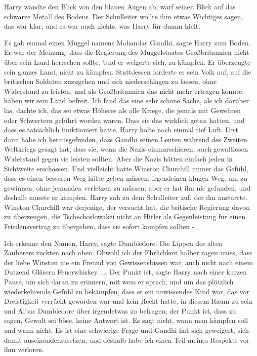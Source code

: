 Harry wandte den Blick von den blauen Augen ab, warf seinen Blick auf das
schwarze Metall des Bodens. Der Schulleiter wollte ihm etwas Wichtiges sagen,
das war klar; und es war auch nichts, was Harry für dumm hielt.

\glqq{}Es gab einmal einen Muggel namens Mohandas Gandhi\grqq{}, sagte Harry zum
Boden. \glqq{}Er war der Meinung, dass die Regierung des Muggelstaates
Großbritannien nicht über sein Land herrschen sollte. Und er weigerte sich, zu
kämpfen. Er überzeugte sein ganzes Land, nicht zu kämpfen. Stattdessen forderte
er sein Volk auf, auf die britischen Soldaten zuzugehen und sich niederschlagen
zu lassen, ohne Widerstand zu leisten, und als Großbritannien das nicht mehr
ertragen konnte, haben wir sein Land befreit. Ich fand das eine sehr schöne
Sache, als ich darüber las, dachte ich, das sei etwas Höheres als alle Kriege,
die jemals mit Gewehren oder Schwertern geführt worden waren. Dass sie das
wirklich getan hatten, und dass es tatsächlich funktioniert hatte.\grqq{} Harry
holte noch einmal tief Luft. \glqq{}Erst dann habe ich herausgefunden, dass
Gandhi seinen Leuten während des Zweiten Weltkriegs gesagt hat, dass sie, wenn
die Nazis einmarschieren, auch gewaltlosen Widerstand gegen sie leisten sollten.
Aber die Nazis hätten einfach jeden in Sichtweite erschossen. Und vielleicht
hatte Winston Churchill immer das Gefühl, dass es einen besseren Weg hätte geben
müssen, irgendeinen klugen Weg, um zu gewinnen, ohne jemanden verletzen zu
müssen; aber er hat ihn nie gefunden, und deshalb musste er kämpfen.\grqq{}
Harry sah zu dem Schulleiter auf, der ihn anstarrte. \glqq{}Winston Churchill war
derjenige, der versucht hat, die britische Regierung davon zu überzeugen, die
Tschechoslowakei nicht an Hitler als Gegenleistung für einen Friedensvertrag zu
übergeben, dass sie sofort kämpfen sollten -\grqq{}

\glqq{}Ich erkenne den Namen, Harry\grqq{}, sagte Dumbledore. Die Lippen des
alten Zauberers zuckten nach oben. \glqq{}Obwohl ich der Ehrlichkeit halber sagen
muss, dass der liebe Winston nie ein Freund von Gewissensbissen war, auch nicht
nach einem Dutzend Gläsern Feuerwhiskey.\grqq{} ... \glqq{}Der Punkt ist\grqq{},
sagte Harry nach einer kurzen Pause, um sich daran zu erinnern, mit wem er
sprach, und um das plötzlich wiederkehrende Gefühl zu bekämpfen, dass er ein
unwissendes Kind war, das vor Dreistigkeit verrückt geworden war und kein Recht
hatte, in diesem Raum zu sein und Albus Dumbledore über irgendetwas zu befragen,
\glqq{}der Punkt ist, dass zu sagen, Gewalt sei böse, keine Antwort ist. Es sagt
nicht, wann man kämpfen soll und wann nicht. Es ist eine schwierige Frage und
Gandhi hat sich geweigert, sich damit auseinanderzusetzen, und deshalb habe ich
einen Teil meines Respekts vor ihm verloren.\grqq{}

